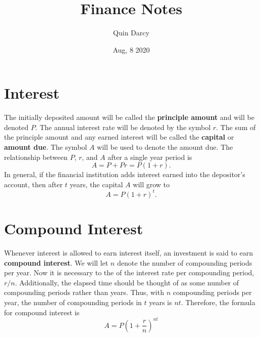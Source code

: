 \documentclass[leqno]{article}
\theoremstyle{definition}
\theoremstyle{remark}
\begin{document}
\title{Finance Notes}
\author{Quin Darcy}
\date{Aug, 8 2020}
\maketitle

\section{Interest}
    The initially deposited amount will be called the \textbf{principle amount} and will be denoted $P$. The annual interest rate will be denoted by the symbol $r$. The sum of the principle amount and any earned interest will be called the \textbf{capital} or \textbf{amount due}. The symbol $A$ will be used to denote the amount due. The relationship between $P$, $r$, and $A$ after a single year period is
        \begin{equation}
            A=P+Pr=P(1+r).
        \end{equation}
    In general, if the financial institution adds interest earned into the depositor's account, then after $t$ years, the capital $A$ will grow to
        \begin{equation}
            A=P(1+r)^t.
        \end{equation}
\section{Compound Interest}
    Whenever interest is allowed to earn interest itself, an investment is said to earn \textbf{compound interest}. We will let $n$ denote the number of compounding periods per year. Now it is necessary to the of the interest rate per compounding period, $r/n$. Additionally, the elapsed time should be thought of as some number of compounding periods rather than years. Thus, with $n$ compounding periods per year, the number of compounding periods in $t$ years is $nt$. Therefore, the formula for compound interest is
        \begin{equation}
            A=P\left(1+\frac{r}{n}\right)^{nt}
        \end{equation}
\end{document}
